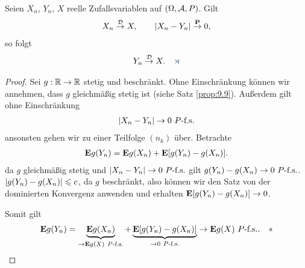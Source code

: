 \begin{prop}
\label{prop:9.4}
Seien $X_{n}$, $Y_{n}$, $X$ reelle Zufallsvariablen auf $(\Omega, {\AA}, P)$.
Gilt
\begin{align*}
X_{n}\Dto X,\qquad
|X_{n} -Y_{n}| \Pto 0,
\end{align*}
so folgt
\begin{align*}
Y_{n} \Dto X.\fishhere
\end{align*}
\end{prop}
\begin{proof}
Sei $g: \R\to\R$ stetig und beschränkt. Ohne Einschränkung können wir annehmen,
dass $g$ gleichmäßig stetig ist (siehe Satz \ref{prop:9.9}). Außerdem gilt ohne
Einschränkung
\begin{align*}
\abs{X_n-Y_n}\to 0\Pfs
\end{align*}
ansonsten gehen wir zu einer Teilfolge $(n_k)$ über. Betrachte
\begin{align*}
\E g(Y_n) = \E g(X_n) + \E[g(Y_n)-g(X_n)].
\end{align*}
da $g$ gleichmäßig stetig und $\abs{X_n-Y_n}\to 0 \Pfs$ gilt $g(Y_n)-g(X_n)\to
0\Pfs$. $\abs{g(Y_n)-g(X_n)}\le c$, da $g$ beschränkt, also können wir den
Satz von der dominierten Konvergenz anwenden und erhalten $\E[g(Y_n)-g(X_n)] \to 0$.

Somit gilt
\begin{align*}
\E g(Y_n) = \underbrace{\E g(X_n)}_{\to \E g(X) \Pfs} +
\underbrace{\E[g(Y_n)-g(X_n)]}_{\to 0 \Pfs} \to \E g(X)\Pfs.\qedhere
\end{align*}
\end{proof}

